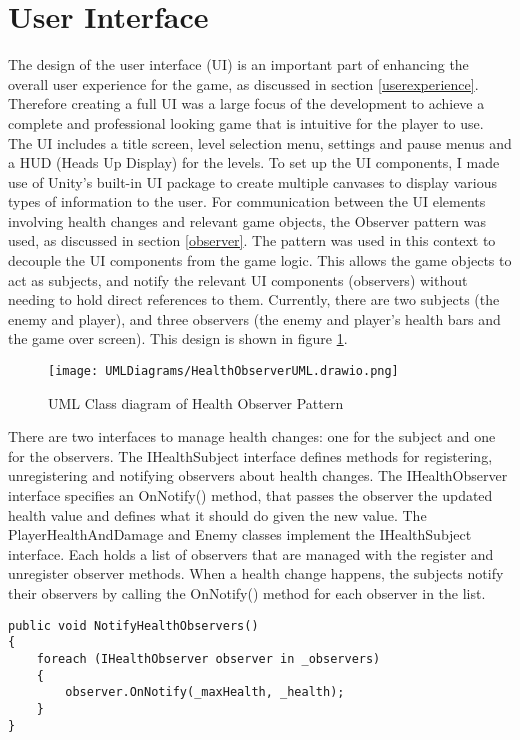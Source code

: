 \documentclass[]{final_report}
\begin{document}
\section{User Interface}
\color{red} The design of the user interface (UI) is an important part of enhancing the overall user experience for the game, as discussed in section \ref{userexperience}. Therefore creating a full UI was a large focus of the development to achieve a complete and professional looking game that is intuitive for the player to use. The UI includes a title screen, level selection menu, settings and pause menus and a HUD (Heads Up Display) for the levels.  \newline
To set up the UI components, \color{black} I made use of Unity's built-in UI package \cite{unity2024_UI} to create multiple canvases to display various types of information to the user. 
For communication between the UI elements involving health changes and relevant game objects, the Observer pattern was used, as discussed in section \ref{observer}. \color{red} The pattern was used \color{black} in this context to decouple the UI components from the game logic. This allows the game objects to act as subjects, and notify the relevant UI components (observers) without needing to hold direct references to them. Currently, there are two subjects (the enemy and player), and three observers (the enemy and player's health bars and the game over screen). This design is shown in figure \ref{fig:label_observer1}.
\begin{figure}[H]
    \centering
    \texttt{[image: UMLDiagrams/HealthObserverUML.drawio.png]}
    \caption{UML Class diagram of Health Observer Pattern}
    \label{fig:label_observer1}
\end{figure}
There are two interfaces to manage health changes: one for the subject and one for the observers. The IHealthSubject interface defines methods for registering, unregistering and notifying observers about health changes. The IHealthObserver interface specifies an OnNotify() method, that passes the observer the updated health value and defines what it should do given the new value. 
The PlayerHealthAndDamage and Enemy classes implement the IHealthSubject interface. Each holds a list of observers that are managed with the register and unregister observer methods. When a health change happens, the subjects notify their observers by calling the OnNotify() method for each observer in the list.  
\begin{verbatim}
public void NotifyHealthObservers()
{
    foreach (IHealthObserver observer in _observers)
    {
        observer.OnNotify(_maxHealth, _health);
    }
}
\end{verbatim}
\end{document}
